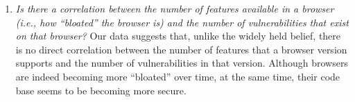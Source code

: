 \begin{enumerate}
\item {\em Is there a correlation between the number of features
    available in a browser (i.e., how ``bloated'' the browser is) and
    the number of vulnerabilities that exist on that browser?} Our
  data suggests that, unlike the widely held belief, there is no
  direct correlation between the number of features that a browser
  version supports and the number of vulnerabilities in that
  version. Although browsers are indeed becoming more ``bloated'' over
  time, at the same time, their code base seems to be becoming more
  secure.
    
\end{enumerate}

